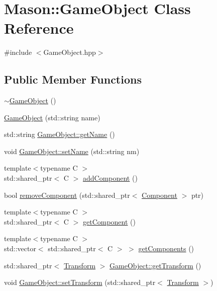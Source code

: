 \hypertarget{class_mason_1_1_game_object}{}\section{Mason\+:\+:Game\+Object Class Reference}
\label{class_mason_1_1_game_object}


{\ttfamily \#include $<$Game\+Object.\+hpp$>$}

\subsection*{Public Member Functions}
\begin{DoxyCompactItemize}
\item 
\hyperlink{class_mason_1_1_game_object_ab82dfdb656f9051c0587e6593b2dda97}{$\sim$\+Game\+Object} ()
\item 
\hyperlink{class_mason_1_1_game_object_a0737657696b478c7962c2a6c2f5b1bd8}{Game\+Object} (std\+::string name)
\item 
std\+::string \hyperlink{class_mason_1_1_game_object_a4b858c3219a8f08b823a4266945fd724}{Game\+Object\+::get\+Name} ()
\item 
void \hyperlink{class_mason_1_1_game_object_ad4e182d7070d243ccbe239459460c36e}{Game\+Object\+::set\+Name} (std\+::string nm)
\item 
{\footnotesize template$<$typename C $>$ }\\std\+::shared\+\_\+ptr$<$ C $>$ \hyperlink{class_mason_1_1_game_object_a4df82cecf4dc31163f04bf01043a1ec8}{add\+Component} ()
\item 
bool \hyperlink{class_mason_1_1_game_object_af22f654507a0f6a5056c0d99bc6cd1b8}{remove\+Component} (std\+::shared\+\_\+ptr$<$ \hyperlink{class_mason_1_1_component}{Component} $>$ ptr)
\item 
{\footnotesize template$<$typename C $>$ }\\std\+::shared\+\_\+ptr$<$ C $>$ \hyperlink{class_mason_1_1_game_object_aa716fbc3fd56fe4f65c85d777ac62eb0}{get\+Component} ()
\item 
{\footnotesize template$<$typename C $>$ }\\std\+::vector$<$ std\+::shared\+\_\+ptr$<$ C $>$ $>$ \hyperlink{class_mason_1_1_game_object_a4c013ffa8f4925e42541b462490e4dca}{get\+Components} ()
\item 
std\+::shared\+\_\+ptr$<$ \hyperlink{class_mason_1_1_transform}{Transform} $>$ \hyperlink{class_mason_1_1_game_object_a0c6b2e4785181f1ab8684fc4af3f170d}{Game\+Object\+::get\+Transform} ()
\item 
void \hyperlink{class_mason_1_1_game_object_a2e0211a7054aa98fd9abec583056e778}{Game\+Object\+::set\+Transform} (std\+::shared\+\_\+ptr$<$ \hyperlink{class_mason_1_1_transform}{Transform} $>$)
\end{DoxyCompactItemize}
